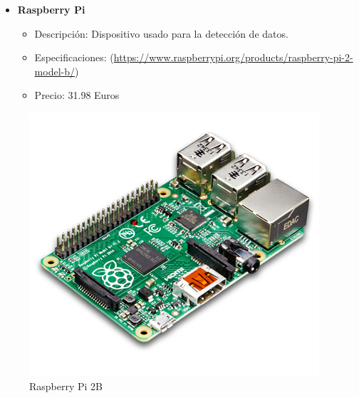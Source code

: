 \begin{itemize}
 \item \textbf{Raspberry Pi}
 \begin{itemize}
  \item Descripción: Dispositivo usado para la detección de datos.
  \item Especificaciones:  (\url{https://www.raspberrypi.org/products/raspberry-pi-2-model-b/})
  \item Precio: 31.98 Euros
 \end{itemize}
\end{itemize}
\begin{figure}[!h]
  \begin{center}
    \includegraphics[scale=0.30]{../images/hardware/pi.png}
    \caption{Raspberry Pi 2B}
    \label{fig:rpi}
  \end{center}
\end{figure}

\newpage

